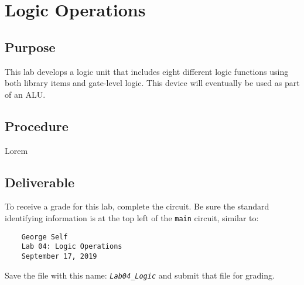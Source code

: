 \chapter{Logic Operations}\label{logic}

\section{Purpose}

This lab develops a logic unit that includes eight different logic functions using both \LE library items and gate-level logic. This device will eventually be used as part of an \acf{ALU}.

\section{Procedure}

Lorem 

\section{Deliverable}

To receive a grade for this lab, complete the circuit. Be sure the standard identifying information is at the top left of the \lstinline{main} circuit, similar to: 

\bigskip
\begin{minipage}{\linewidth}
	\begin{verbatim}
	George Self
	Lab 04: Logic Operations
	September 17, 2019
	\end{verbatim}
\end{minipage}
\bigskip

Save the file with this name: \emph{\texttt{Lab04\_Logic}} and submit that file for grading.

